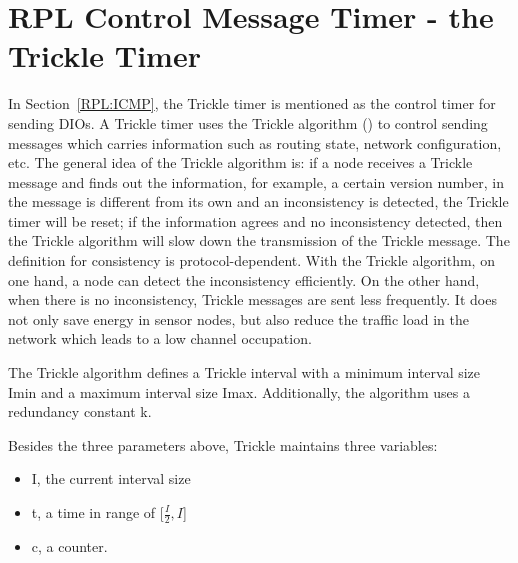 \section{RPL Control Message Timer - the Trickle Timer}
\label{Trickle}
In Section~\ref{RPL:ICMP}, the Trickle timer is mentioned as the control timer for sending DIOs. A Trickle timer uses the Trickle algorithm (\cite{RFC 6206}) to control sending messages which carries information such as routing state, network configuration, etc. The general idea of the Trickle algorithm is: if a node receives a Trickle message and finds out the information, for example, a certain version number, in the message is different from its own and an inconsistency is detected, the Trickle timer will be reset; if the information agrees and no inconsistency detected, then the Trickle algorithm will slow down the transmission of the Trickle message. The definition for consistency is protocol-dependent. With the Trickle algorithm, on one hand, a node can detect the inconsistency efficiently. On the other hand, when there is no inconsistency, Trickle messages are sent less frequently. It does not only save energy in sensor nodes, but also reduce the traffic load in the network which leads to a low channel occupation. 
\newline

The Trickle algorithm defines a Trickle interval with a minimum interval size Imin and a maximum interval size Imax. Additionally, the algorithm uses a redundancy constant k.

Besides the three parameters above, Trickle maintains three variables:
 \begin{itemize}
 \item I, the current interval size
 \newline
 
 \item t, a time in range of [$\frac{I}{2}, I$]
 \newline
 
 \item c, a counter.
\newline
\end{itemize}

